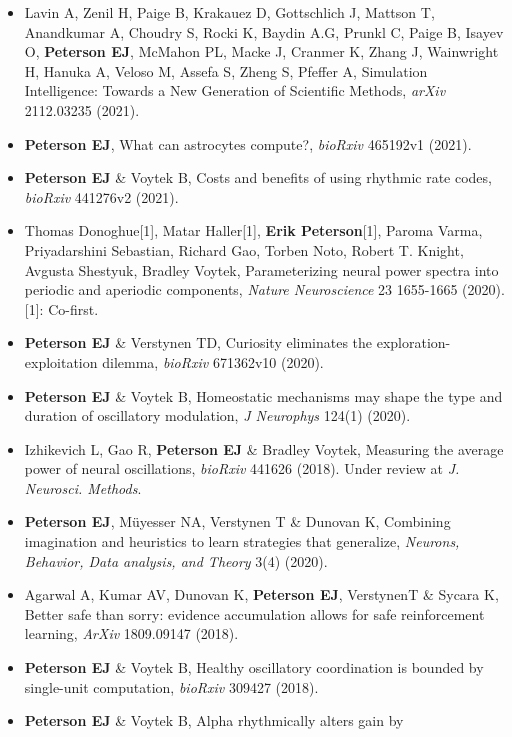 \begin{itemize}
\item
  Lavin A, Zenil H, Paige B, Krakauez D, Gottschlich J, Mattson T,
  Anandkumar A, Choudry S, Rocki K, Baydin A.G, Prunkl C, Paige B,
  Isayev O, \textbf{Peterson EJ}, McMahon PL, Macke J, Cranmer K, Zhang
  J, Wainwright H, Hanuka A, Veloso M, Assefa S, Zheng S, Pfeffer A,
  Simulation Intelligence: Towards a New Generation of Scientific
  Methods, \emph{arXiv} 2112.03235 (2021).
\item
  \textbf{Peterson EJ}, What can astrocytes compute?, \emph{bioRxiv}
  465192v1 (2021).
\item
  \textbf{Peterson EJ} \& Voytek B, Costs and benefits of using rhythmic
  rate codes, \emph{bioRxiv} 441276v2 (2021).
\item
  Thomas Donoghue{[}1{]}, Matar Haller{[}1{]}, \textbf{Erik
  Peterson}{[}1{]}, Paroma Varma, Priyadarshini Sebastian, Richard Gao,
  Torben Noto, Robert T. Knight, Avgusta Shestyuk, Bradley Voytek,
  Parameterizing neural power spectra into periodic and aperiodic
  components, \emph{Nature Neuroscience} 23 1655-1665 (2020). {[}1{]}:
  Co-first.
\item
  \textbf{Peterson EJ} \& Verstynen TD, Curiosity eliminates the
  exploration-exploitation dilemma, \emph{bioRxiv} 671362v10 (2020).
\item
  \textbf{Peterson EJ} \& Voytek B, Homeostatic mechanisms may shape the
  type and duration of oscillatory modulation, \emph{J Neurophys} 124(1)
  (2020).
\item
  Izhikevich L, Gao R, \textbf{Peterson EJ} \& Bradley Voytek, Measuring
  the average power of neural oscillations, \emph{bioRxiv} 441626
  (2018). Under review at \emph{J. Neurosci. Methods}.
\item
  \textbf{Peterson EJ}, Müyesser NA, Verstynen T \& Dunovan K, Combining
  imagination and heuristics to learn strategies that generalize,
  \emph{Neurons, Behavior, Data analysis, and Theory} 3(4) (2020).
\item
  Agarwal A, Kumar AV, Dunovan K, \textbf{Peterson EJ}, VerstynenT \&
  Sycara K, Better safe than sorry: evidence accumulation allows for
  safe reinforcement learning, \emph{ArXiv} 1809.09147 (2018).
\item
  \textbf{Peterson EJ} \& Voytek B, Healthy oscillatory coordination is
  bounded by single-unit computation, \emph{bioRxiv} 309427 (2018).
\item
  \textbf{Peterson EJ} \& Voytek B, Alpha rhythmically alters gain by

\end{itemize}
